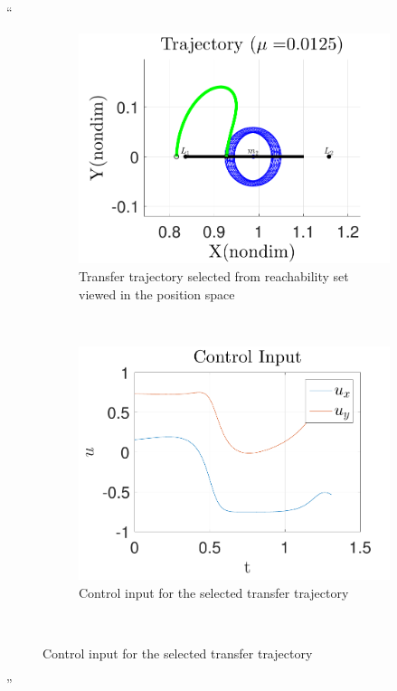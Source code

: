 \documentclass[11pt]{article}
\newenvironment{correction}{\begin{list}{}{\setlength{\leftmargin}{1cm}\setlength{\rightmargin}{1cm}}\vspace{\parsep}\item[]``}{''\end{list}}
\begin{document}
\begin{itemize}
\begin{correction}
\begin{figure}
                \begin{subfigure}[htbp]{0.4\textwidth} 
                    \includegraphics[width=\textwidth]{reach_transfer} 
                    \caption{Transfer trajectory selected from reachability set viewed in the position space} \label{fig:reach_transfer} 
                \end{subfigure}~ 
                \begin{subfigure}[htbp]{0.4\textwidth} 
                    \includegraphics[width=\textwidth]{control_input_l1} 
                    \caption{Control input for the selected transfer trajectory} \label{fig:control_l1} 
                \end{subfigure}~


\end{figure}
\end{correction}
\end{itemize}
\end{document}
